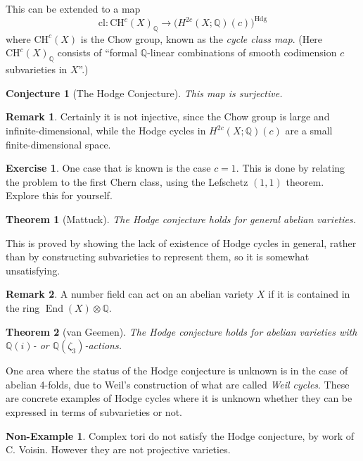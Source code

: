 \documentclass{article}
\newtheorem*{conjecture}{Conjecture}
\newtheorem*{theorem}{Theorem}
\theoremstyle{definition}
\newtheorem*{nonexample}{Non-Example}
\newtheorem*{remark}{Remark}
\newtheorem*{exercise}{Exercise}
\DeclareMathOperator{\End}{End}
\newcommand{\cl}{\mathrm{cl}}
\newcommand{\CH}{\mathrm{CH}}
\newcommand{\Hdg}{\mathrm{Hdg}}
\newcommand{\Q}{\mathbb{Q}}
\begin{document}
This can be extended to a map
\begin{equation*}
    \cl:\CH^c(X)_\Q \to \bigl(H^{2c}(X;\Q)(c)\bigr)^\Hdg
\end{equation*}
where $\CH^c(X)$ is the Chow group, known as the \emph{cycle class map}. (Here
$\CH^c(X)_\Q$ consists of ``formal $\Q$-linear combinations of smooth
codimension $c$ subvarieties in $X$''.)

\begin{conjecture}[The Hodge Conjecture]
    This map is surjective.
\end{conjecture}

\begin{remark}
    Certainly it is not injective, since the Chow group is large and
    infinite-dimensional, while the Hodge cycles in $H^{2c}(X;\Q)(c)$ are a
    small finite-dimensional space.
\end{remark}

\begin{exercise}
    One case that is known is the case $c=1$. This is done by relating the
    problem to the first Chern class, using the Lefschetz $(1,1)$ theorem.
    Explore this for yourself.
\end{exercise}

\begin{theorem}[Mattuck]
    The Hodge conjecture holds for general abelian varieties.
\end{theorem}
This is proved by showing the lack of existence of Hodge cycles in general,
rather than by constructing subvarieties to represent them, so it is somewhat
unsatisfying.

\begin{remark}
    A number field can act on an abelian variety $X$ if it is contained in the
    ring $\End(X)\otimes\Q$.
\end{remark}

\begin{theorem}[van Geemen]
    The Hodge conjecture holds for abelian varieties with $\Q(i)$- or
    $\Q(\zeta_3)$-actions.
\end{theorem}

One area where the status of the Hodge conjecture is unknown is in the case of
abelian 4-folds, due to Weil's construction of what are called \emph{Weil
cycles}. These are concrete examples of Hodge cycles where it is unknown whether
they can be expressed in terms of subvarieties or not.

\begin{nonexample}
    Complex tori do not satisfy the Hodge conjecture, by work of C. Voisin.
    However they are not projective varieties.
\end{nonexample}
\end{document}
